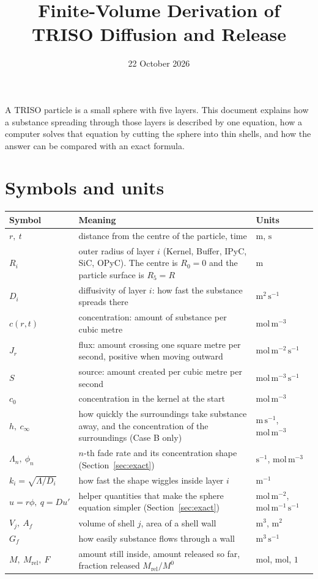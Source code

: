 \documentclass[11pt]{article}
\title{Finite-Volume Derivation of TRISO Diffusion and Release}
\author{}
\date{22 October 2026}
\begin{document}
\maketitle

A TRISO particle is a small sphere with five layers. This document explains how a substance spreading through those layers is described by one equation, how a computer solves that equation by cutting the sphere into thin shells, and how the answer can be compared with an exact formula.

\section*{Symbols and units}
\begin{center}
\begin{tabular}{@{}>{\raggedright\arraybackslash}p{}>{\raggedright\arraybackslash}p{}>{\raggedright\arraybackslash}p{}@{}}
\toprule
Symbol & Meaning & Units\\
\midrule
$r,\ t$ & distance from the centre of the particle, time & $\mathrm{m}$, $\mathrm{s}$\\
$R_i$ & outer radius of layer $i$ (Kernel, Buffer, IPyC, SiC, OPyC). The centre is $R_0=0$ and the particle surface is $R_5=R$ & $\mathrm{m}$\\
$D_i$ & diffusivity of layer $i$: how fast the substance spreads there & $\mathrm{m^2\,s^{-1}}$\\
$c(r,t)$ & concentration: amount of substance per cubic metre & $\mathrm{mol\,m^{-3}}$\\
$J_r$ & flux: amount crossing one square metre per second, positive when moving outward & $\mathrm{mol\,m^{-2}\,s^{-1}}$\\
$S$ & source: amount created per cubic metre per second & $\mathrm{mol\,m^{-3}\,s^{-1}}$\\
$c_0$ & concentration in the kernel at the start & $\mathrm{mol\,m^{-3}}$\\
$h,\ c_\infty$ & how quickly the surroundings take substance away, and the concentration of the surroundings (Case B only) & $\mathrm{m\,s^{-1}}$, $\mathrm{mol\,m^{-3}}$\\
$\Lambda_n,\ \phi_n$ & $n$-th fade rate and its concentration shape (Section~\ref{sec:exact}) & $\mathrm{s^{-1}}$, $\mathrm{mol\,m^{-3}}$\\
$k_i=\sqrt{\Lambda/D_i}$ & how fast the shape wiggles inside layer $i$ & $\mathrm{m^{-1}}$\\
$u=r\phi,\ q=Du'$ & helper quantities that make the sphere equation simpler (Section~\ref{sec:exact}) & $\mathrm{mol\,m^{-2}}$, $\mathrm{mol\,m^{-1}\,s^{-1}}$\\
$V_j,\ A_f$ & volume of shell $j$, area of a shell wall & $\mathrm{m^3}$, $\mathrm{m^2}$\\
$G_f$ & how easily substance flows through a wall & $\mathrm{m^3\,s^{-1}}$\\
$M,\ M_{\mathrm{rel}},\ F$ & amount still inside, amount released so far, fraction released $M_{\mathrm{rel}}/M^0$ & $\mathrm{mol}$, $\mathrm{mol}$, $1$\\
\bottomrule
\end{tabular}
\end{center}
\end{document}
